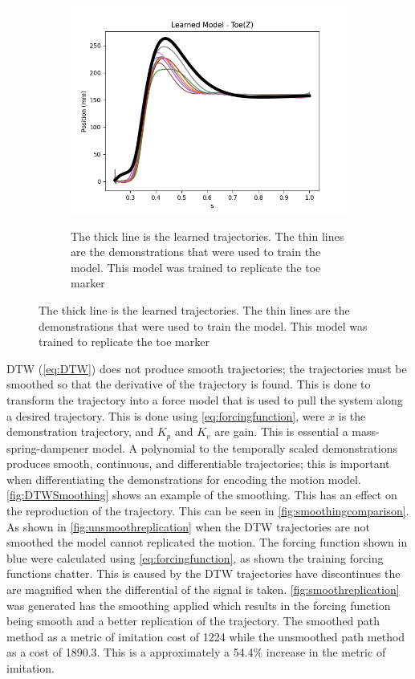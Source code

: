 \begin{figure}[h!]
\begin{subfigure}{0.4\linewidth}
{        \includegraphics[scale=0.50]{images/software/learnedZ.png}}
        \caption{The thick line is the learned trajectories. The thin lines are the demonstrations that were used to train the model. This model was trained to replicate the toe marker}
        \label{fig:learned}
    \end{subfigure}
    \label{fig:LFDexample}
\end{figure}


DTW (\autoref{eq:DTW}) does not produce smooth trajectories; the trajectories must be smoothed so that the derivative of the trajectory is found. This is done to transform the trajectory into a force model that is used to pull the system along a desired trajectory. This is done using \autoref{eq:forcingfunction}, were $x$ is the demonstration trajectory, and $K_p$ and $K_v$ are gain. This is essential a mass-spring-dampener model. A polynomial to the temporally scaled demonstrations produces smooth, continuous, and differentiable trajectories; this is important when differentiating the demonstrations for encoding the motion model.  \autoref{fig:DTWSmoothing} shows an example of the smoothing. This has an effect on the reproduction of the trajectory. This can be seen in \autoref{fig:smoothingcomparison}. As shown in \autoref{fig:unsmoothreplication} when the DTW trajectories are not smoothed the model cannot replicated the motion. The forcing function shown in blue were calculated using \autoref{eq:forcingfunction}, as shown the training forcing functions chatter. This is caused by the DTW trajectories have discontinues the are magnified when the differential of the signal is taken.  \autoref{fig:smoothreplication} was generated has the smoothing applied which results in the forcing function being smooth and a better replication of the trajectory. The smoothed path method as a metric of imitation cost of 1224 while the unsmoothed path method as a cost of 1890.3. This is a approximately a 54.4\% increase in the metric of imitation. 

